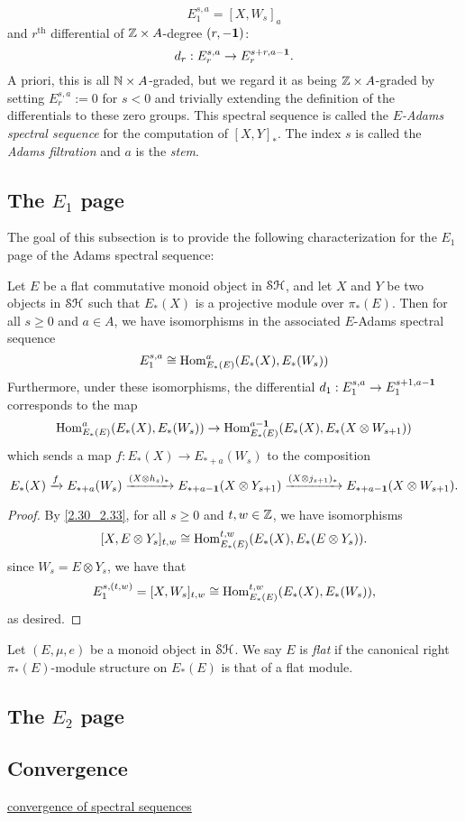 \documentclass[../main.tex]{subfiles}
\begin{document}
\begin{definition}
	\[E_1^{s,a}=[X,W_s]_{a}\]
	and $r^\text{th}$ differential of $\mathbb{Z}\times A$-degree $(r,-\mathbf{1})$:
	\[d_r:E_r^{s,a}\to E_r^{s+r,a-\mathbf{1}}.\]
	A priori, this is all $\mathbb{N}\times A$-graded, but we regard it as being $\mathbb{Z}\times A$-graded by setting $E_r^{s,a}:=0$ for $s<0$ and trivially extending the definition of the differentials to these zero groups. This spectral sequence is called the \emph{$E$-Adams spectral sequence} for the computation of $[X,Y]_\ast$. The index $s$ is called the \emph{Adams filtration} and $a$ is the \emph{stem}.
\end{definition}


\subsection{The \texorpdfstring{$E_1$}{TEXT} page}

The goal of this subsection is to provide the following characterization for the $E_1$ page of the Adams spectral sequence:

\begin{theorem}
	Let $E$ be a flat commutative monoid object in $\mathcal{SH}$, and let $X$ and $Y$ be two objects in $\mathcal{SH}$ such that $E_\ast(X)$ is a projective module over $\pi_\ast(E)$. Then for all $s\geq0$ and $a\in A$, we have isomorphisms in the associated $E$-Adams spectral sequence
	\[E_1^{s,a}\cong\mathrm{Hom}_{E_\ast(E)}^{a}(E_\ast(X),E_\ast(W_s))\]
	Furthermore, under these isomorphisms, the differential $d_1:E_1^{s,a}\to E_1^{s+1,a-\mathbf{1}}$ corresponds to the map
	\[\mathrm{Hom}_{E_\ast(E)}^{a}(E_\ast(X),E_\ast(W_s))\to\mathrm{Hom}_{E_\ast(E)}^{a-\mathbf{1}}(E_\ast(X),E_\ast(X\otimes W_{s+1}))\]
	which sends a map $f:E_\ast(X)\to E_{\ast+a}(W_s)$ to the composition 
	\[E_\ast(X)\xrightarrow f E_{\ast+a}(W_s)\xrightarrow{(X\otimes h_s)_\ast}E_{\ast+a-\mathbf{1}}(X\otimes Y_{s+1})\xrightarrow{(X\otimes j_{s+1})_\ast}E_{\ast+a-\mathbf{1}}(X\otimes W_{s+1}).\]
\end{theorem}
\begin{proof}
	By \autoref{2.30_2.33}, for all $s\geq0$ and $t,w\in\mathbb{Z}$, we have isomorphisms
	\[[X,E\otimes Y_s]_{t,w}\cong\mathrm{Hom}_{E_\ast(E)}^{t,w}(E_\ast(X),E_\ast(E\otimes Y_s)).\]
	since $W_s=E\otimes Y_s$, we have that
	\[E_1^{s,(t,w)}=[X,W_s]_{t,w}\cong\mathrm{Hom}_{E_\ast(E)}^{t,w}(E_\ast(X),E_\ast(W_s)),\]
	as desired. 
\end{proof}

\begin{definition}
	Let $(E,\mu,e)$ be a monoid object in $\mathcal{SH}$. We say $E$ is \emph{flat} if the canonical right $\pi_\ast(E)$-module structure on $E_\ast(E)$ is that of a flat module.
\end{definition}

\subsection{The \texorpdfstring{$E_2$}{E\_2} page}

\subsection{Convergence}

\href{https://www.uio.no/studier/emner/matnat/math/MAT9580/v12/undervisningsmateriale/boardman-conditionally-1999.pdf}{convergence of spectral sequences}
\end{document}
